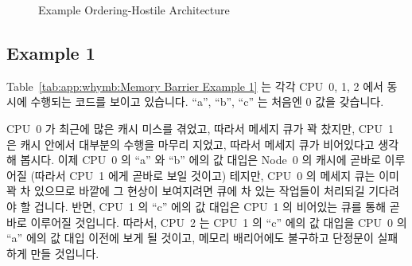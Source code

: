 \begin{figure}[htb]
\centering
{}
\caption{Example Ordering-Hostile Architecture}
\label{fig:app:whymb:Example Ordering-Hostile Architecture}
\end{figure}

\subsection{Example 1}
\label{sec:app:whymb:Example 1}

Table~\ref{tab:app:whymb:Memory Barrier Example 1} 는 각각 CPU~0, 1, 2 에서
동시에 수행되는 코드를 보이고 있습니다.
``a'', ``b'', ``c'' 는 처음엔 0 값을 갖습니다.
\iffalse

Table~\ref{tab:app:whymb:Memory Barrier Example 1}
shows three code fragments, executed concurrently by CPUs~0, 1, and 2.
Each of ``a'', ``b'', and ``c'' are initially zero.
\fi

\begin{table*}
\small
{}
\caption{Memory Barrier Example 1}
\label{tab:app:whymb:Memory Barrier Example 1}
\end{table*}

CPU~0 가 최근에 많은 캐시 미스를 겪었고, 따라서 메세지 큐가 꽉 찼지만, CPU~1 은
캐시 안에서 대부분의 수행을 마무리 지었고, 따라서 메세지 큐가 비어있다고 생각해
봅시다.
이제 CPU~0 의 ``a'' 와 ``b'' 에의 값 대입은 Node~0 의 캐시에 곧바로 이루어질
(따라서 CPU~1 에게 곧바로 보일 것이고) 테지만, CPU~0 의 메세지 큐는 이미 꽉 차
있으므로 바깥에 그 현상이 보여지려면 큐에 차 있는 작업들이 처리되길 기다려야 할
겁니다.
반면, CPU~1 의 ``c'' 에의 값 대입은 CPU~1 의 비어있는 큐를 통해 곧바로 이루어질
것입니다.
따라서, CPU~2 는 CPU~1 의 ``c'' 에의 값 대입을 CPU~0 의 ``a'' 에의 값 대입
이전에 보게 될 것이고, 메모리 배리어에도 불구하고 단정문이 실패하게 만들
것입니다.

